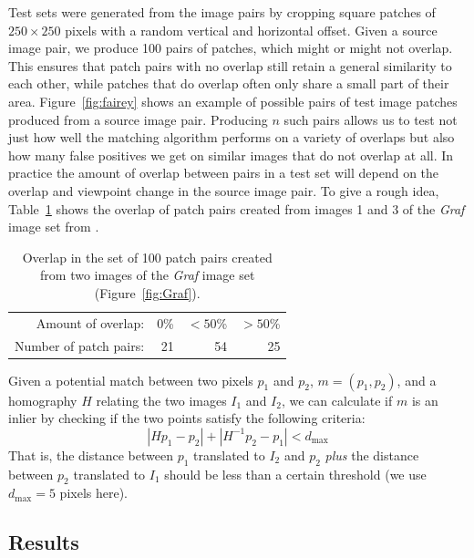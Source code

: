 \documentclass{article}
\begin{document}
Test sets were generated from the image pairs by cropping square patches of
$250\!\times\!250$ pixels with a random vertical and horizontal offset.  
Given a source image pair, we produce 100 pairs of patches, which might or might not overlap.  
This ensures that patch pairs with no overlap still retain a general similarity to each 
other, while patches that do overlap often only share a small 
part of their area. Figure~\ref{fig:fairey} shows an example of 
possible pairs of test image patches produced from a source image pair.  
Producing $n$ such pairs allows us to test not just how well the 
matching algorithm performs on a variety of overlaps but also how many 
false positives we get on similar images that do not overlap at all. In 
practice the amount of overlap between pairs in a test set will depend 
on the overlap and viewpoint change in the source image pair.  To give a 
rough idea, Table~\ref{table:overlap} shows the overlap of patch pairs 
created from images 1 and 3 of the \emph{Graf} image set from 
\cite{mikolajczyk2005performance}.

\begin{table}[htb]
\caption{Overlap in the set of 100 patch pairs created from two images 
of the \emph{Graf} image set (Figure~\ref{fig:Graf}).}
\label{table:overlap}
    \centering
\begin{tabular}{r*{3}{r}}
\hline
    Amount of overlap: & 0\% & $< 50$\% & $> 50$\%  \\
    \noalign{\smallskip}
    Number of patch pairs: & 21 & 54 & 25 \\
    \hline
\end{tabular}
\end{table}

Given a potential match between two pixels $p_1$ and $p_2$, $m = 
\left(p_1, p_2\right)$, and a homography $H$ relating the two images 
$I_1$ and $I_2$, we can calculate if $m$ is an inlier by checking if the 
two points satisfy the following criteria:
\begin{equation*}
\left\vert H p_1 - p_2 \right\vert + \left\vert H^{-1}p_2 - p_1 \right\vert < d_{\max}
\end{equation*}
That is, the distance between $p_1$ translated to $I_2$ and $p_2$ 
\emph{plus} the distance between $p_2$ translated to $I_1$ should be 
less than a certain threshold (we use $d_{\max}=5$ pixels here).


\subsection{Results}
\label{S:Results}
\end{document}

